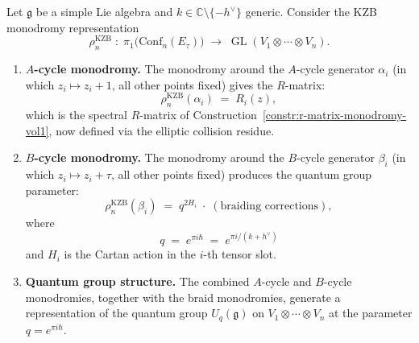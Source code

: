 \begin{theorem}
\label{thm:b-cycle-quantum-group}
Let $\mathfrak{g}$ be a simple Lie algebra and $k \in \mathbb{C}
\setminus \{-h^\vee\}$ generic. Consider the KZB monodromy
representation
\[
\rho_n^{\mathrm{KZB}}
\;\colon\;
\pi_1\bigl(\mathrm{Conf}_n(E_\tau)\bigr)
\;\longrightarrow\;
\operatorname{GL}(V_1 \otimes \cdots \otimes V_n).
\]
\begin{enumerate}[label=\textup{(\roman*)}]
\item \textbf{$A$-cycle monodromy.}
The monodromy around the $A$-cycle generator $\alpha_i$ (in which
$z_i \mapsto z_i + 1$, all other points fixed) gives the $R$-matrix:
\[
\rho_n^{\mathrm{KZB}}(\alpha_i)
\;=\;
R_i(z),
\]
which is the spectral $R$-matrix of
Construction~\textup{\ref{constr:r-matrix-monodromy-vol1}},
now defined via the elliptic collision residue.

\item \textbf{$B$-cycle monodromy.}
The monodromy around the $B$-cycle generator $\beta_i$ (in which
$z_i \mapsto z_i + \tau$, all other points fixed) produces the
quantum group parameter:
\[
\rho_n^{\mathrm{KZB}}(\beta_i)
\;=\;
q^{2H_i}
\;\cdot\;
(\text{braiding corrections}),
\]
where
\begin{equation}\label{eq:q-parameter}
q
\;=\;
e^{\pi i\hbar}
\;=\;
e^{\pi i/(k + h^\vee)}
\end{equation}
and $H_i$ is the Cartan action in the $i$-th tensor slot.

\item \textbf{Quantum group structure.}
The combined $A$-cycle and $B$-cycle monodromies, together with the braid
monodromies, generate a representation of the quantum group
$U_q(\mathfrak{g})$ on $V_1 \otimes \cdots \otimes V_n$ at the parameter
$q = e^{\pi i\hbar}$.
\end{enumerate}
\end{theorem}

